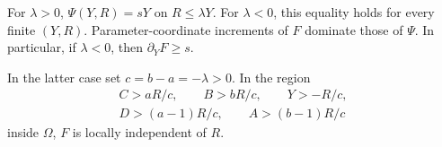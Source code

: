 \begin{lemma}\label{ent:predictability}
For $\lambda>0$,
$\Psi(Y,R)=sY$ on $R\leq\lambda Y$.
For $\lambda<0$, this equality holds for every finite $(Y,R)$.
Parameter-coordinate increments of $F$ dominate those of $\Psi$.
In particular, if $\lambda<0$, then $\partial_YF\geq s$.

In the latter case set $c=b-a=-\lambda>0$.  In the region
\begin{equation}\label{eq:source-12}
\begin{gathered}
C>aR/c,\qquad B>bR/c,\qquad Y>-R/c,\\
D>(a-1)R/c,\qquad A>(b-1)R/c
\end{gathered}
\end{equation}
inside $\Omega$, $F$ is locally independent of $R$.
\end{lemma}

